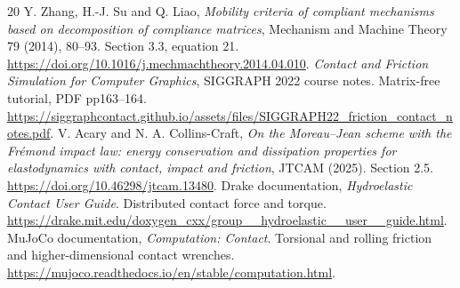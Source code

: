 \documentclass[11pt,a4paper]{article}
\begin{document}
\begin{thebibliography}{20}
 Y. Zhang, H.-J. Su and Q. Liao, \emph{Mobility criteria of compliant mechanisms based on decomposition of compliance matrices}, Mechanism and Machine Theory 79 (2014), 80--93. Section 3.3, equation 21. \url{https://doi.org/10.1016/j.mechmachtheory.2014.04.010}.
 \emph{Contact and Friction Simulation for Computer Graphics}, SIGGRAPH 2022 course notes. Matrix-free tutorial, PDF pp163--164. \url{https://siggraphcontact.github.io/assets/files/SIGGRAPH22_friction_contact_notes.pdf}.
 V. Acary and N. A. Collins-Craft, \emph{On the Moreau--Jean scheme with the Fr\'emond impact law: energy conservation and dissipation properties for elastodynamics with contact, impact and friction}, JTCAM (2025). Section 2.5. \url{https://doi.org/10.46298/jtcam.13480}.
 Drake documentation, \emph{Hydroelastic Contact User Guide}. Distributed contact force and torque. \url{https://drake.mit.edu/doxygen_cxx/group__hydroelastic__user__guide.html}.
 MuJoCo documentation, \emph{Computation: Contact}. Torsional and rolling friction and higher-dimensional contact wrenches. \url{https://mujoco.readthedocs.io/en/stable/computation.html}.
\end{thebibliography}
\endgroup
\end{document}
